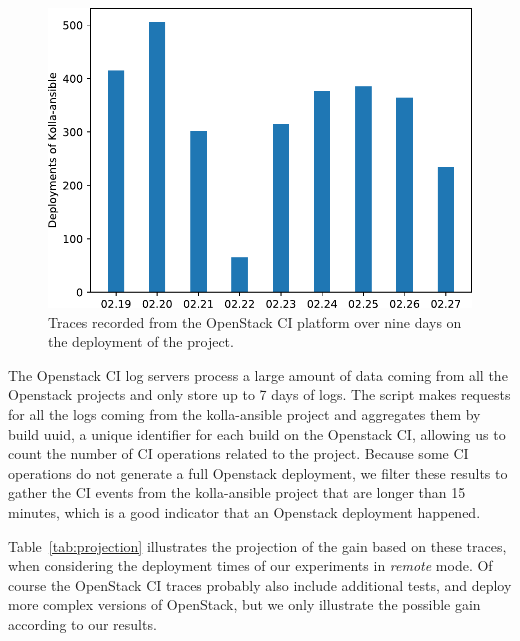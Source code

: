\begin{figure}[tbp]
	\begin{center}
		\includegraphics[width=0.9\linewidth]{./images/kolla_deployments.pdf}
	\end{center}
	\caption{Traces recorded from the OpenStack CI platform over nine days on the 
	deployment of the \kolla project.}
	\label{fig:oci}
\end{figure}

The Openstack CI log servers process a large amount of data coming from all
the Openstack projects and only store up to 7 days of logs. The script makes
requests for all the logs coming from the kolla-ansible project and aggregates
them by build uuid, a unique identifier for each build on the Openstack CI,
allowing us to count the number of CI operations related to the project.
Because some CI operations do not generate a full Openstack deployment, we filter
these results to gather the CI events from the kolla-ansible project that are
longer than 15 minutes, which is a good indicator that an Openstack deployment
happened.

Table~\ref{tab:projection} illustrates the projection of the gain based on these 
traces, when considering the deployment times of our experiments in \emph{remote} mode. 
Of course the OpenStack CI traces probably also include additional tests, and 
deploy more complex versions of OpenStack, but we only illustrate the 
possible gain according to our results. 

